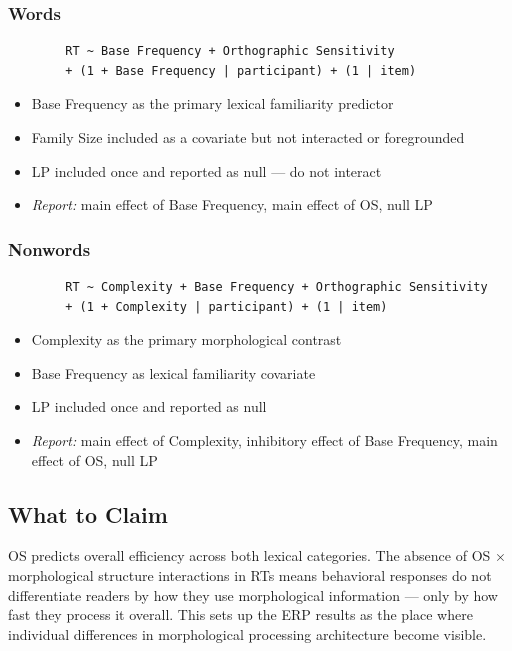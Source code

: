 \documentclass[12pt]{article}
\begin{document}
	\subsubsection{Words}
	
	\begin{verbatim}
		RT ~ Base Frequency + Orthographic Sensitivity
		+ (1 + Base Frequency | participant) + (1 | item)
	\end{verbatim}
	
	\begin{itemize}
		\item Base Frequency as the primary lexical familiarity predictor
		\item Family Size included as a covariate but not interacted or foregrounded
		\item LP included once and reported as null --- do not interact
		\item \textit{Report:} main effect of Base Frequency, main effect of OS, null LP
	\end{itemize}
	
	\subsubsection{Nonwords}
	
	\begin{verbatim}
		RT ~ Complexity + Base Frequency + Orthographic Sensitivity
		+ (1 + Complexity | participant) + (1 | item)
	\end{verbatim}
	
	\begin{itemize}
		\item Complexity as the primary morphological contrast
		\item Base Frequency as lexical familiarity covariate
		\item LP included once and reported as null
		\item \textit{Report:} main effect of Complexity, inhibitory effect of Base Frequency, main effect of OS, null LP
	\end{itemize}
	
	\subsection{What to Claim}
	
	OS predicts overall efficiency across both lexical categories. The absence of OS $\times$ morphological structure interactions in RTs means behavioral responses do not differentiate readers by how they use morphological information --- only by how fast they process it overall. This sets up the ERP results as the place where individual differences in morphological processing architecture become visible.
	
\end{document}

